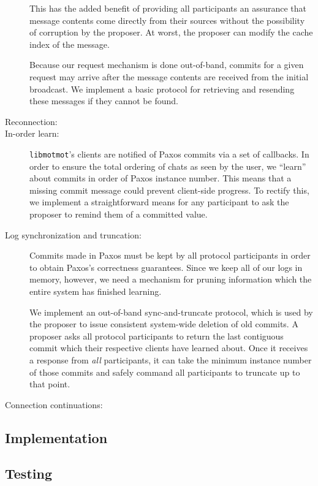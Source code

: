 \documentclass{sig-alternate}
\newcommand\libmotmot{\texttt{libmotmot}\xspace}
\begin{document}
\begin{description}
    This has the added benefit of providing all participants an assurance that
    message contents come directly from their sources without the possibility
    of corruption by the proposer.  At worst, the proposer can modify the
    cache index of the message.

    Because our request mechanism is done out-of-band, commits for a given
    request may arrive after the message contents are received from the initial
    broadcast.  We implement a basic protocol for retrieving and resending
    these messages if they cannot be found.

  \item[Reconnection:]

  \item[In-order learn:]
    \libmotmot's clients are notified of Paxos commits via a set of callbacks.
    In order to ensure the total ordering of chats as seen by the user, we
    ``learn'' about commits in order of Paxos instance number.  This means that
    a missing commit message could prevent client-side progress.  To rectify
    this, we implement a straightforward means for any participant to ask the
    proposer to remind them of a committed value.

  \item[Log synchronization and truncation:]
    Commits made in Paxos must be kept by all protocol participants in order
    to obtain Paxos's correctness guarantees.  Since we keep all of our logs
    in memory, however, we need a mechanism for pruning information which
    the entire system has finished learning.

    We implement an out-of-band sync-and-truncate protocol, which is used by
    the proposer to issue consistent system-wide deletion of old commits.  A
    proposer asks all protocol participants to return the last contiguous
    commit which their respective clients have learned about.  Once it receives
    a response from \emph{all} participants, it can take the minimum instance
    number of those commits and safely command all participants to truncate
    up to that point.

  \item[Connection continuations:]
\end{description}

\subsection{Implementation}

\subsection{Testing}
\end{document}
